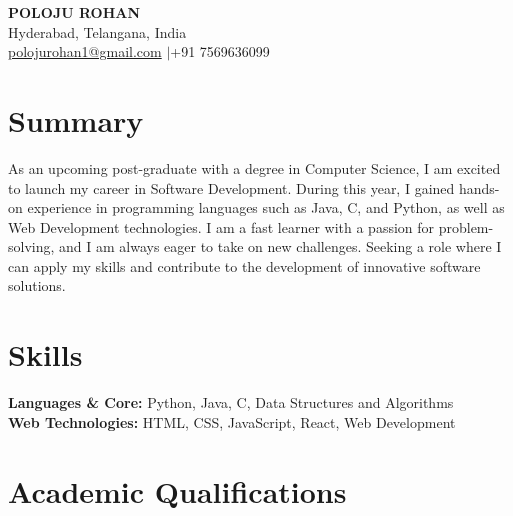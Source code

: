\documentclass[a4paper,10pt]{article}
\begin{document}
	
	\pagestyle{empty}
	
	\begin{center}
		{\LARGE \textbf{POLOJU ROHAN}} \\[4pt]
		Hyderabad, Telangana, India \\[2pt]
		\href{mailto:polojurohan1@gmail.com}{polojurohan1@gmail.com} \quad$|$\quad +91 7569636099
	\end{center}
	
	\vspace{-4pt}
	
	\section{Summary}
	As an upcoming post-graduate with a degree in Computer Science, I am excited to launch my career in Software Development. During this year, I gained hands-on experience in programming languages such as Java, C, and Python, as well as Web Development technologies. I am a fast learner with a passion for problem-solving, and I am always eager to take on new challenges. Seeking a role where I can apply my skills and contribute to the development of innovative software solutions.
	
	\section{Skills}
	\textbf{Languages \& Core:} Python, Java, C, Data Structures and Algorithms \\
	\textbf{Web Technologies:} HTML, CSS, JavaScript, React, Web Development
	
	\section{Academic Qualifications}
	
\end{document}
